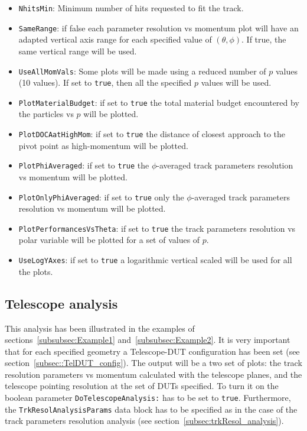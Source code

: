 \begin{itemize}
  \item {\tt NhitsMin}:  Minimum number of hits requested to fit the track. 
  
  \item {\tt SameRange}: if false each parameter resolution vs momentum plot will have an adapted vertical axis range for each specified value of $(\theta,\phi)$. If true, the same vertical 
  range will be used.
  
  \item {\tt UseAllMomVals}: Some plots will be made using a reduced number of $p$ values (10 values). If set to {\tt true}, then all the specified $p$ values will be used.
  
  \item {\tt PlotMaterialBudget}: if set to {\tt true} the total material budget encountered by the particles vs $p$ will be plotted.
  
  \item {\tt PlotDOCAatHighMom}: if set to {\tt true} the distance of closest approach to the pivot point as high-momentum will be plotted.
  
  \item {\tt PlotPhiAveraged}: if set to {\tt true} the $\phi$-averaged track parameters resolution vs momentum will be plotted.
  
  \item {\tt PlotOnlyPhiAveraged}: if set to {\tt true} only the $\phi$-averaged track parameters resolution vs momentum will be plotted.
  
  \item {\tt PlotPerformancesVsTheta}: if set to {\tt true} the track parameters resolution vs polar variable will be plotted for a set of values of $p$.
  
  \item {\tt UseLogYAxes}: if set to {\tt true} a logarithmic vertical scaled will be used for all the plots.
  
\end{itemize}


\subsection{Telescope analysis}
\label{subsec:telescope_analysis}

This analysis has been illustrated in the examples of sections~\ref{subsubsec:Example1} and~\ref{subsubsec:Example2}. It is very important that for each specified geometry 
a Telescope-DUT configuration has been set (see section~\ref{subsec::TelDUT_config}). The output will be a two set of plots: the track resolution parameters vs momentum calculated 
with the telescope planes, and the telescope pointing resolution at the set of DUTs specified. To turn it on the boolean parameter {\tt DoTelescopeAnalysis:} has to be set to {\tt true}. 
Furthermore, the {\tt TrkResolAnalysisParams} data block has to be specified as in the case of the track parameters resolution analysis (see section~\ref{subsec:trkResol_analysis}).

